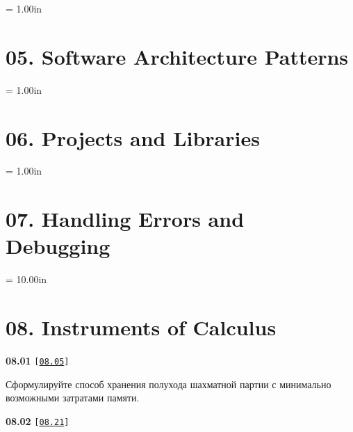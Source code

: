 \documentclass[a4paper,12pt]{article}
\begin{document}
\newpage\thispagestyle{empty}\pdfpageheight = 1.00in\enlargethispage{100in}

\section{05. Software Architecture Patterns}



\newpage\thispagestyle{empty}\pdfpageheight = 1.00in\enlargethispage{100in}

\section{06. Projects and Libraries}



\newpage\thispagestyle{empty}\pdfpageheight = 1.00in\enlargethispage{100in}

\section{07. Handling Errors and Debugging}



\newpage\thispagestyle{empty}\pdfpageheight = 10.00in\enlargethispage{100in}

\section{08. Instruments of Calculus}

{\large \textbf{08.01} \texttt{[\href{https://github.com/i-s-m-mipt/Education/blob/master/projects/examples/source/08.05.cpp}{\texttt{08.05}}]}}

\bigskip

Сформулируйте способ хранения полухода шахматной партии с минимально возможными затратами памяти.

\bigskip

{\large \textbf{08.02} \texttt{[\href{https://github.com/i-s-m-mipt/Education/blob/master/projects/examples/source/08.21.cpp}{\texttt{08.21}}]}}

\bigskip
\end{document}

